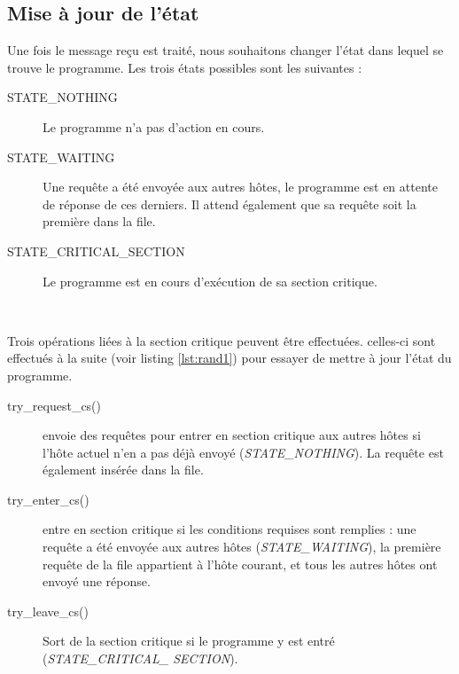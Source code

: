 \subsection{Mise à jour de l'état}
Une fois le message reçu est traité, nous souhaitons changer l'état dans lequel se trouve le programme. Les trois états possibles sont les suivantes :\\

\begin{description}
    \item[STATE\_NOTHING] Le programme n'a pas d'action en cours.
    \item[STATE\_WAITING] Une requête a été envoyée aux autres hôtes, le programme est en attente de réponse de ces derniers. Il attend également que sa requête soit la première dans la file.
    \item[STATE\_CRITICAL\_SECTION] Le programme est en cours d'exécution de sa section critique.
\end{description}
\

Trois opérations liées à la section critique peuvent être effectuées. celles-ci sont effectués à la suite (voir listing \ref{lst:rand1}) pour essayer de mettre à jour l'état du programme.\\

\begin{description}
    \item[try\_request\_cs()] envoie des requêtes pour entrer en section critique aux autres hôtes si l'hôte actuel n'en a pas déjà envoyé (\emph{STATE\_NOTHING}). La requête est également insérée dans la file.

    \item[try\_enter\_cs()] entre en section critique si les conditions requises sont remplies : une requête a été envoyée aux autres hôtes (\emph{STATE\_WAITING}), la première requête de la file appartient à l'hôte courant, et tous les autres hôtes ont envoyé une réponse.

    \item[try\_leave\_cs()] Sort de la section critique si le programme y est entré (\emph{STATE\_CRITICAL\_ SECTION}).
\end{description}

